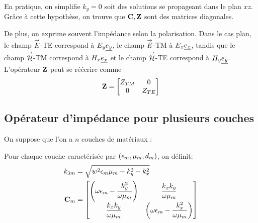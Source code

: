         En pratique, on simplifie $k_y = 0$ soit des solutions se propageant dans le plan $xz$. Grâce à cette hypothèse, on trouve que $\mC, \mZ$ sont des matrices diagonales. 

        De plus, on exprime souvent l'impédance selon la polarisation. Dans le cas plan, le champ $\vE$-TE correspond à $E_y \v{e_y}$, le champ $\vE$-TM à $E_x \v{e_x}$, tandis que le champ $\vH$-TM correspond à $H_x \v{e_x}$ et le champ $\vH$-TE correspond à $H_y \v{e_y}$.
        L'opérateur $\mZ$ peut se réécrire comme 
        \begin{equation}
            \mZ = 
            \begin{bmatrix}
                Z_{TM} & 0 
                \\
                0 & Z_{TE}
            \end{bmatrix}
        \end{equation}


    \subsection{Opérateur d'impédance pour plusieurs couches}
        On suppose que l'on a $n$ couches de matériaux : 

        \begin{figure}[h!btp]
            \centering
            \begin{tikzpicture}
                
            \end{tikzpicture}
        \end{figure}

        Pour chaque couche caractérisée par $(\eps_m,\mu_m,d_m)$, on définit:
        \begin{align}
        k_{3m} &= \sqrt{w^2\eps_m\mu_m - k_y^2 - k_x^2}
        \\
        \mC_m &=
            \begin{bmatrix}
                \left(\w\eps_m-\frac{k_y^2}{\w\mu_m}\right) & \frac{k_xk_y}{\w\mu_m}\\
                \frac{k_xk_y}{\w\mu_m} & \left(\w\eps_m-\frac{k_x^2}{\w\mu_m}\right)
            \end{bmatrix}
        \end{align}

